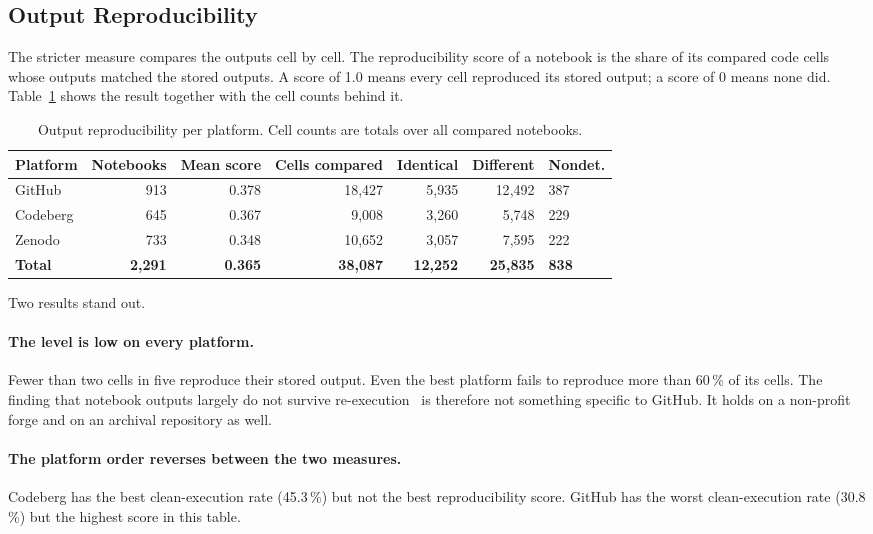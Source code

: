 \subsection{Output Reproducibility}

The stricter measure compares the outputs cell by cell. The reproducibility score of a notebook is the share of its compared code cells whose outputs matched the stored outputs. A score of 1.0 means every cell reproduced its stored output; a score of 0 means none did. Table~\ref{tab:repro-scores} shows the result together with the cell counts behind it.

\begin{table}[htbp]
\centering
\caption{Output reproducibility per platform. Cell counts are totals over all compared notebooks.}
\label{tab:repro-scores}
\small
\begin{tabularx}{\textwidth}{@{}l r r r r r X@{}}
\toprule
Platform & Notebooks & Mean score & Cells compared & Identical & Different & Nondet.\tabularnewline
\midrule
GitHub & 913 & 0.378 & 18{,}427 & 5{,}935 & 12{,}492 & 387\tabularnewline
Codeberg & 645 & 0.367 & 9{,}008 & 3{,}260 & 5{,}748 & 229\tabularnewline
Zenodo & 733 & 0.348 & 10{,}652 & 3{,}057 & 7{,}595 & 222\tabularnewline
\midrule
\textbf{Total} & \textbf{2{,}291} & \textbf{0.365} & \textbf{38{,}087} & \textbf{12{,}252} & \textbf{25{,}835} & \textbf{838}\tabularnewline
\bottomrule
\end{tabularx}
\end{table}

Two results stand out.

\paragraph{The level is low on every platform.} Fewer than two cells in five reproduce their stored output. Even the best platform fails to reproduce more than 60\,\% of its cells. The finding that notebook outputs largely do not survive re-execution~\cite{pimentel2019,samuel2024computational} is therefore not something specific to GitHub. It holds on a non-profit forge and on an archival repository as well.

\paragraph{The platform order reverses between the two measures.} Codeberg has the best clean-execution rate (45.3\,\%) but not the best reproducibility score. GitHub has the worst clean-execution rate (30.8\,\%) but the highest score in this table.


